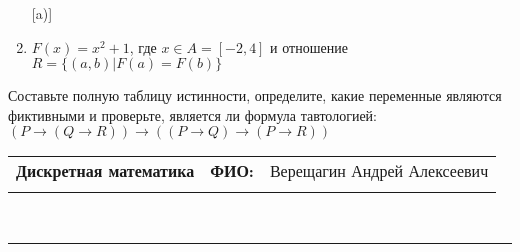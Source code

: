 \documentclass[10pt]{exam}
\newcommand{\class}{Дискретная математика}
\newcommand{\examdate}{}
\begin{document}
\begin{questions}
\begin{enumerate} [a)]
\item $F(x)=x^{2}+1$, где $x \in A = [-2, 4]$ и отношение $R = \{(a,b)|F(a) = F(b)\}$
\end{enumerate}\question Составьте полную таблицу истинности, определите, какие переменные являются фиктивными и проверьте, является ли формула тавтологией:
$(P \rightarrow (Q \rightarrow R)) \rightarrow ((P \rightarrow Q) \rightarrow (P \rightarrow R))$

\end{questions}
\newpage
\begin{flushright}
\begin{tabular}{p{2.8in} r l}
\textbf{\class} & \textbf{ФИО:} &Верещагин Андрей Алексеевич
\\

\textbf{\examdate} &&\\
\end{tabular}\\
\end{flushright}
\rule[1ex]{\textwidth}{.1pt}
\end{document}
